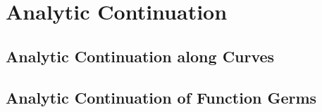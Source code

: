 \documentclass[../Moduli_Spaces_of_Riemann_Surfaces.tex]{subfiles}
\begin{document}
    \section{Analytic Continuation}
    \subsection{Analytic Continuation along Curves}
    \subsection{Analytic Continuation of Function Germs}
\end{document}
